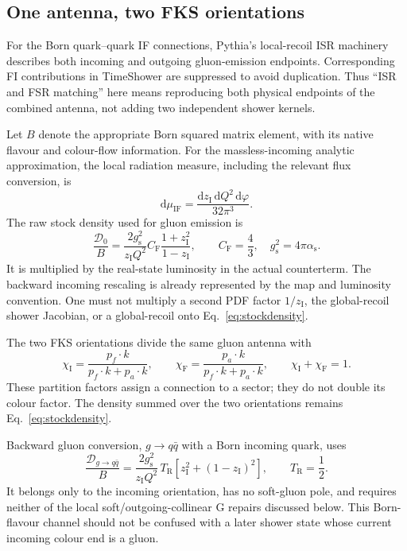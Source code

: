 \documentclass[11pt,a4paper]{article}
\newcommand{\dd}{\mathrm{d}}
\newcommand{\as}{\alpha_{\mathrm{s}}}
\newcommand{\gs}{g_{\mathrm{s}}}
\newcommand{\CF}{C_{\mathrm{F}}}
\newcommand{\TR}{T_{\mathrm{R}}}
\newcommand{\zI}{z_{\mathrm{I}}}
\newcommand{\code}[1]{\texttt{\detokenize{#1}}}
\begin{document}
\subsection{One antenna, two FKS orientations}

For the Born quark--quark IF connections, Pythia's local-recoil ISR machinery
describes both incoming and outgoing gluon-emission endpoints. Corresponding
FI contributions in TimeShower are suppressed to avoid duplication. Thus
``ISR and FSR matching'' here means reproducing both physical endpoints of
the combined antenna, not adding two independent shower kernels.

Let $B$ denote the appropriate Born squared matrix element, with its native
flavour and colour-flow information. For the massless-incoming analytic
approximation, the local radiation measure, including the relevant flux
conversion, is
\begin{equation}
 \dd\mu_{\mathrm{IF}}=
 \frac{\dd\zI\,\dd Q^2\,\dd\varphi}{32\pi^3}.
\end{equation}
The raw stock density used for gluon emission is
\begin{equation}
 \boxed{\frac{\mathcal D_0}{B}
 =\frac{2\gs^2}{\zI Q^2}
   \CF\frac{1+\zI^2}{1-\zI},\qquad \CF=\frac43,
 \quad\gs^2=4\pi\as.}\label{eq:stockdensity}
\end{equation}
It is multiplied by the real-state luminosity in the actual counterterm.
The backward incoming rescaling is already represented by the map and
luminosity convention. One must not multiply a second PDF factor $1/\zI$,
the global-recoil shower Jacobian, or a global-recoil \code{xfact} onto
Eq.~\eqref{eq:stockdensity}.

The two FKS orientations divide the same gluon antenna with
\begin{equation}
 \chi_{\mathrm I}=\frac{p_f\cdot k}{p_f\cdot k+p_a\cdot k},
 \qquad
 \chi_{\mathrm F}=\frac{p_a\cdot k}{p_f\cdot k+p_a\cdot k},
 \qquad \chi_{\mathrm I}+\chi_{\mathrm F}=1.
\end{equation}
These partition factors assign a connection to a sector; they do not double
its colour factor. The density summed over the two orientations remains
Eq.~\eqref{eq:stockdensity}.

Backward gluon conversion, $g\to q\bar q$ with a Born incoming quark, uses
\begin{equation}
 \frac{\mathcal D_{g\to q\bar q}}{B}
 =\frac{2\gs^2}{\zI Q^2}\,
 \TR[\zI^2+(1-\zI)^2],\qquad \TR=\frac12.
\end{equation}
It belongs only to the incoming orientation, has no soft-gluon pole, and
requires neither of the local soft/outgoing-collinear G repairs discussed
below. This Born-flavour channel should not be confused with a later shower
state whose current incoming colour end is a gluon.
\end{document}
